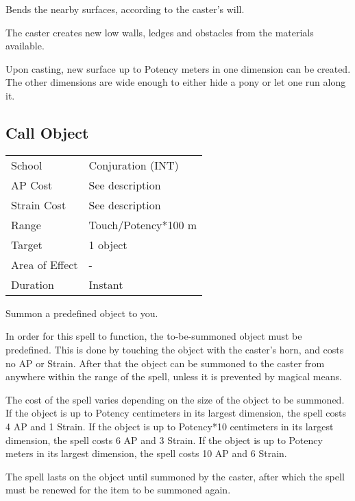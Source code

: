 \documentclass[11pt,a4paper,twocolumn]{book}
\begin{document}
\medskip

Bends the nearby surfaces, according to the caster's will.

The caster creates new low walls, ledges and obstacles from the materials available.

Upon casting, new surface up to Potency meters in one dimension can be created. The other dimensions are wide enough to either hide a pony or let one run along it.


\subsection*{Call Object}
{
	\begin{tabu} to 75mm{| X[l,4] | X[l,7] |}
		\hline
		School 			& Conjuration (INT) 	\\
		AP Cost	      	& See description 		\\
		Strain Cost     & See description 		\\
		Range     		& Touch/Potency*100 m 	\\
		Target      	& 1 object 				\\
		Area of Effect  & -	 					\\
		Duration     	& Instant 				\\ \hline
	\end{tabu}
	
}

\medskip

Summon a predefined object to you.

In order for this spell to function, the to-be-summoned object must be predefined. This is done by touching the object with the caster's horn, and costs no AP or Strain. After that the object can be summoned to the caster from anywhere within the range of the spell, unless it is prevented by magical means.

The cost of the spell varies depending on the size of the object to be summoned. If the object is up to Potency centimeters in its largest dimension, the spell costs 4 AP and 1 Strain. If the object is up to Potency*10 centimeters in its largest dimension, the spell costs 6 AP and 3 Strain. If the object is up to Potency meters in its largest dimension, the spell costs 10 AP and 6 Strain.

The spell lasts on the object until summoned by the caster, after which the spell must be renewed for the item to be summoned again.
\end{document}

